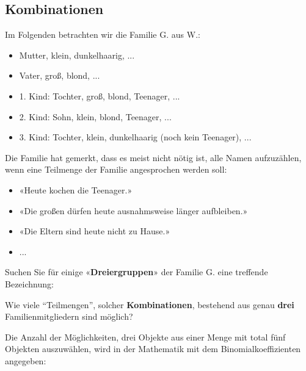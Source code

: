
\newpage



\subsection{Kombinationen}
Im Folgenden betrachten wir die Familie G. aus W.:
\begin{itemize}
\item Mutter, klein, dunkelhaarig, ...
\item Vater, groß, blond, ...
\item 1. Kind: Tochter, groß, blond, Teenager, ...
\item 2. Kind: Sohn, klein, blond, Teenager, ...
\item 3. Kind: Tochter, klein, dunkelhaarig (noch kein Teenager), ...
\end{itemize}

Die Familie hat gemerkt, dass es meist nicht nötig ist, alle Namen
aufzuzählen, wenn eine Teilmenge der Familie angesprochen werden soll:

\begin{itemize}
\item «Heute kochen die Teenager.»
\item «Die großen dürfen heute ausnahmsweise länger aufbleiben.»
\item «Die Eltern sind heute nicht zu Hause.»
  \item ...
\end{itemize}


Suchen Sie für einige «\textbf{Dreiergruppen}» der Familie G. eine treffende Bezeichnung:

\newpage



Wie viele ``Teilmengen'', solcher \textbf{Kombinationen}, bestehend aus genau \textbf{drei} Familienmitgliedern sind möglich?



Die Anzahl der Möglichkeiten, drei Objekte aus einer Menge mit total
fünf Objekten auszuwählen, wird in der Mathematik mit dem
Binomialkoeffizienten angegeben:

